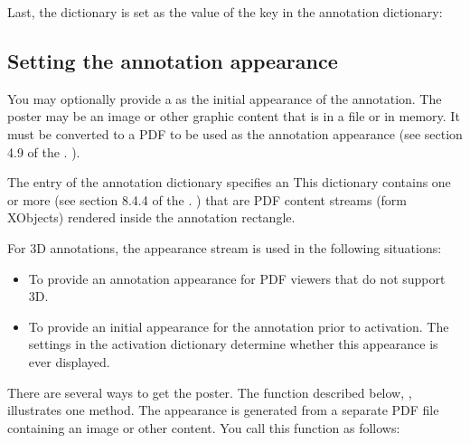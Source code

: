 \documentclass[letterpaper,12pt,english,openany,oneside]{sphinxmanual}
\begin{document}
Last, the dictionary is set as the value of the  key in the annotation dictionary:

\begin{sphinxVerbatim}[commandchars=\\\{\}]
  
\end{sphinxVerbatim}


\subsection{Setting the annotation appearance}
\label{\detokenize{Plugins_3D_samples:setting-the-annotation-appearance}}
You may optionally provide a  as the initial appearance of the annotation. The poster may be an image or other graphic content that is in a file or in memory. It must be converted to a PDF  to be used as the annotation appearance (see section 4.9 of the . ).

The  entry of the annotation dictionary specifies an  This dictionary contains one or more  (see section 8.4.4 of the . ) that are PDF content streams (form XObjects) rendered inside the annotation rectangle.

For 3D annotations, the appearance stream is used in the following situations:
\begin{itemize}
\item {} 
To provide an annotation appearance for PDF viewers that do not support 3D.

\item {} 
To provide an initial appearance for the annotation prior to activation. The settings in the activation dictionary determine whether this appearance is ever displayed.

\end{itemize}

There are several ways to get the poster. The function described below, , illustrates one method. The appearance is generated from a separate PDF file containing an image or other content. You call this function as follows:
\end{document}
